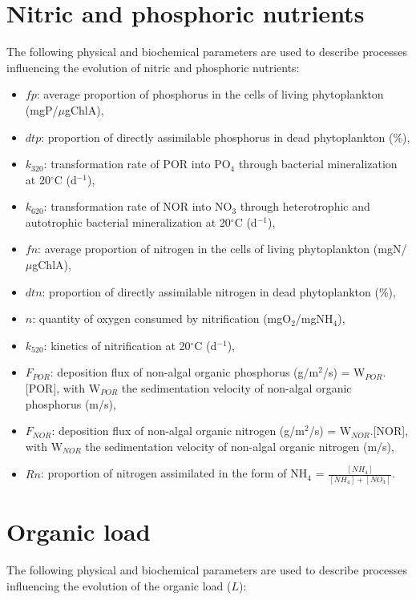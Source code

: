 \section{Nitric and phosphoric nutrients}

The following physical and biochemical parameters are used to describe processes
influencing the evolution of nitric and phosphoric nutrients:

\begin{itemize}
\item $fp$: average proportion of phosphorus in the cells of living phytoplankton (mgP/$\mu$gChlA),
\item $dtp$: proportion of directly assimilable phosphorus in dead phytoplankton ($\%$),
\item $k_{320}$: transformation rate of POR into PO$_4$ through bacterial mineralization
  at 20$^{\circ}$C (d$^{-1}$),
\item $k_{620}$: transformation rate of NOR into NO$_3$ through heterotrophic and autotrophic
  bacterial mineralization at 20$^{\circ}$C (d$^{-1}$),
\item $fn$: average proportion of nitrogen in the cells of living phytoplankton (mgN/$\mu$gChlA),
\item $dtn$: proportion of directly assimilable nitrogen in dead phytoplankton ($\%$),
\item $n$: quantity of oxygen consumed by nitrification (mgO$_2$/mgNH$_4$),
\item $k_{520}$: kinetics of nitrification at 20$^{\circ}$C (d$^{-1}$),
\item $F_{POR}$: deposition flux of non-algal organic phosphorus (g/m$^2$/s) = W$_{POR}$.[POR],
  with W$_{POR}$ the sedimentation velocity of non-algal organic phosphorus (m/s),
\item $F_{NOR}$: deposition flux of non-algal organic nitrogen (g/m$^2$/s) = W$_{NOR}$.[NOR],
  with W$_{NOR}$ the sedimentation velocity of non-algal organic nitrogen (m/s),
\item $Rn$: proportion of nitrogen assimilated in the form of NH$_4$ = $\frac{[NH_4]}{[NH_4]+[NO_3]}$.
\end{itemize}

\section{Organic load}

The following physical and biochemical parameters are used to describe processes
influencing the evolution of the organic load ($L$):

